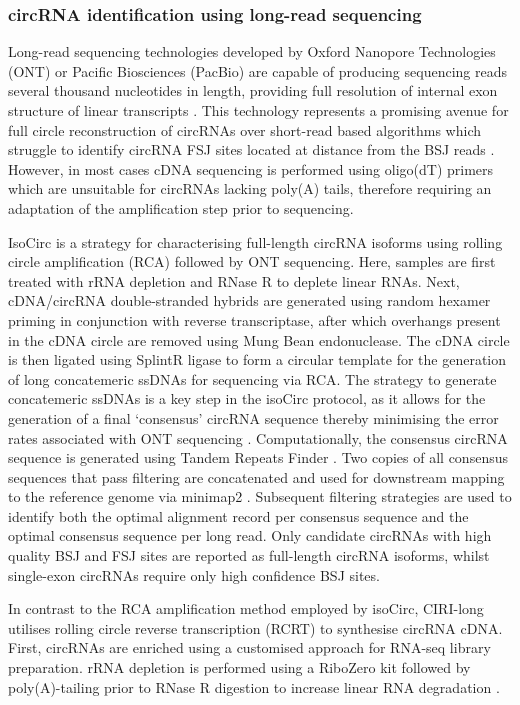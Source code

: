 \subsubsection{circRNA identification using long-read sequencing}
Long-read sequencing technologies developed by Oxford Nanopore Technologies (ONT) or Pacific Biosciences (PacBio) are capable of producing sequencing reads several thousand nucleotides in length, providing full resolution of internal exon structure of linear transcripts \cite{Rhoads2015Oct,Deamer2016May,Byrne2017Jul,vanDijk2018Sep}. This technology represents a promising avenue for full circle reconstruction of circRNAs over short-read based algorithms which struggle to identify circRNA FSJ sites located at distance from the BSJ reads \cite{CIRI-AS,CIRI-full,FUCHS}. However, in most cases cDNA sequencing is performed using oligo(dT) primers which are unsuitable for circRNAs lacking poly(A) tails, therefore requiring an adaptation of the amplification step prior to sequencing. \par
IsoCirc \cite{isoCirc} is a strategy for characterising full-length circRNA isoforms using rolling circle amplification (RCA) followed by ONT sequencing. Here, samples are first treated with rRNA depletion and RNase R to deplete linear RNAs. Next, cDNA/circRNA double-stranded hybrids are generated using random hexamer priming in conjunction with reverse transcriptase, after which overhangs present in the cDNA circle are removed using Mung Bean endonuclease. The cDNA circle is then ligated using SplintR ligase to form a circular template for the generation of long concatemeric ssDNAs for sequencing via RCA. The strategy to generate concatemeric ssDNAs is a key step in the isoCirc protocol, as it allows for the generation of a final `consensus' circRNA sequence thereby minimising the error rates associated with ONT sequencing \cite{Jain2015Apr}. Computationally, the consensus circRNA sequence is generated using Tandem Repeats Finder \cite{Benson1999Jan}. Two copies of all consensus sequences that pass filtering are concatenated and used for downstream mapping to the reference genome via minimap2 \cite{Li2018Sep}. Subsequent filtering strategies are used to identify both the optimal alignment record per consensus sequence and the optimal consensus sequence per long read. Only candidate circRNAs with high quality BSJ and FSJ sites are reported as full-length circRNA isoforms, whilst single-exon circRNAs require only high confidence BSJ sites. \par
In contrast to the RCA amplification method employed by isoCirc, CIRI-long \cite{CIRIlong} utilises rolling circle reverse transcription (RCRT) to synthesise circRNA cDNA. First, circRNAs are enriched using a customised approach for RNA-seq library preparation. rRNA depletion is performed using a RiboZero kit followed by poly(A)-tailing prior to RNase R digestion to increase linear RNA degradation \cite{Xiao2019Sep}.
